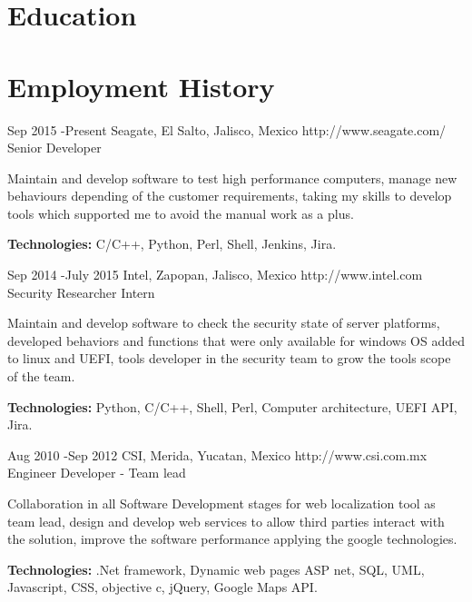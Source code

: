 \documentclass[10pt]{article} %
\begin{document}
\section{Education}





\section{Employment History}

\job
{Sep 2015 -}{Present}
{Seagate, El Salto, Jalisco, Mexico}
{http://www.seagate.com/}
{Senior Developer}
{Maintain and develop software to test high performance computers, manage new behaviours depending of the customer requirements, taking my skills to develop tools which supported me to avoid the manual work as a plus.\\
\rule{0mm}{5mm}\textbf{Technologies:} C/C++, Python, Perl, Shell, Jenkins, Jira.}


\job
{Sep 2014 -}{July 2015}
{Intel, Zapopan, Jalisco, Mexico}
{http://www.intel.com}
{Security Researcher Intern}
{Maintain and develop software to check the security state of server platforms, developed behaviors and functions that were only available for windows OS added to linux and UEFI, tools developer in the security team to grow the tools scope of the team.\\
\rule{0mm}{5mm}\textbf{Technologies:} Python, C/C++, Shell, Perl, Computer architecture, UEFI API, Jira.}

\job
{Aug 2010 -}{Sep 2012}
{CSI, Merida, Yucatan, Mexico}
{http://www.csi.com.mx}
{Engineer Developer - Team lead }
{Collaboration in all Software Development stages for web localization tool as team lead, design and develop web services to allow third parties interact with the solution, improve the software performance applying the google technologies.\\
\rule{0mm}{5mm}\textbf{Technologies:} .Net framework, Dynamic web pages ASP net, SQL, UML, Javascript, CSS, objective c, jQuery, Google Maps API.
}
\end{document}
